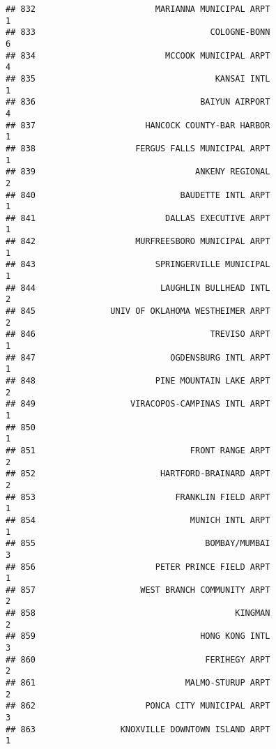 \documentclass[
]{article}
\begin{document}
\begin{verbatim}
## 832                        MARIANNA MUNICIPAL ARPT                           1
## 833                                   COLOGNE-BONN                           6
## 834                          MCCOOK MUNICIPAL ARPT                           4
## 835                                    KANSAI INTL                           1
## 836                                 BAIYUN AIRPORT                           4
## 837                      HANCOCK COUNTY-BAR HARBOR                           1
## 838                    FERGUS FALLS MUNICIPAL ARPT                           1
## 839                                ANKENY REGIONAL                           2
## 840                             BAUDETTE INTL ARPT                           1
## 841                          DALLAS EXECUTIVE ARPT                           1
## 842                    MURFREESBORO MUNICIPAL ARPT                           1
## 843                        SPRINGERVILLE MUNICIPAL                           1
## 844                         LAUGHLIN BULLHEAD INTL                           2
## 845               UNIV OF OKLAHOMA WESTHEIMER ARPT                           2
## 846                                   TREVISO ARPT                           1
## 847                           OGDENSBURG INTL ARPT                           1
## 848                        PINE MOUNTAIN LAKE ARPT                           2
## 849                   VIRACOPOS-CAMPINAS INTL ARPT                           1
## 850                                                                          1
## 851                               FRONT RANGE ARPT                           2
## 852                         HARTFORD-BRAINARD ARPT                           2
## 853                            FRANKLIN FIELD ARPT                           1
## 854                               MUNICH INTL ARPT                           1
## 855                                  BOMBAY/MUMBAI                           3
## 856                        PETER PRINCE FIELD ARPT                           1
## 857                     WEST BRANCH COMMUNITY ARPT                           2
## 858                                        KINGMAN                           2
## 859                                 HONG KONG INTL                           3
## 860                                  FERIHEGY ARPT                           2
## 861                              MALMO-STURUP ARPT                           2
## 862                      PONCA CITY MUNICIPAL ARPT                           3
## 863                 KNOXVILLE DOWNTOWN ISLAND ARPT                           1

\end{verbatim}
\end{document}
